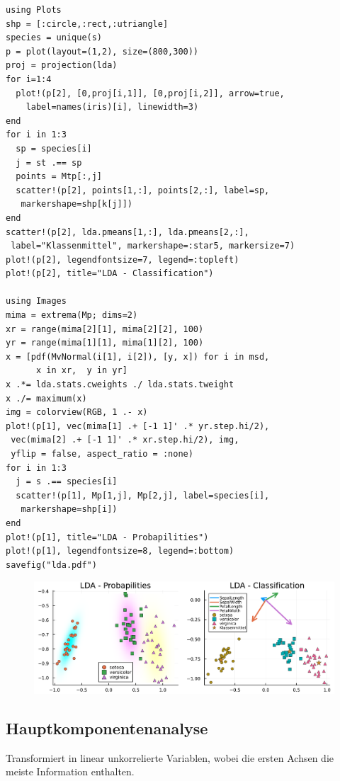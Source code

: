\documentclass[10pt,twocolumn]{scrartcl}
\begin{document}
\begin{lstlisting}
using Plots
shp = [:circle,:rect,:utriangle]
species = unique(s)
p = plot(layout=(1,2), size=(800,300))
proj = projection(lda)
for i=1:4
  plot!(p[2], [0,proj[i,1]], [0,proj[i,2]], arrow=true,
    label=names(iris)[i], linewidth=3)
end
for i in 1:3
  sp = species[i]
  j = st .== sp
  points = Mtp[:,j]
  scatter!(p[2], points[1,:], points[2,:], label=sp,
   markershape=shp[k[j]])
end
scatter!(p[2], lda.pmeans[1,:], lda.pmeans[2,:],
 label="Klassenmittel", markershape=:star5, markersize=7)
plot!(p[2], legendfontsize=7, legend=:topleft)
plot!(p[2], title="LDA - Classification")

using Images
mima = extrema(Mp; dims=2)
xr = range(mima[2][1], mima[2][2], 100)
yr = range(mima[1][1], mima[1][2], 100)
x = [pdf(MvNormal(i[1], i[2]), [y, x]) for i in msd,
      x in xr,  y in yr]
x .*= lda.stats.cweights ./ lda.stats.tweight
x ./= maximum(x)
img = colorview(RGB, 1 .- x)
plot!(p[1], vec(mima[1] .+ [-1 1]' .* yr.step.hi/2),
 vec(mima[2] .+ [-1 1]' .* xr.step.hi/2), img,
 yflip = false, aspect_ratio = :none)
for i in 1:3
  j = s .== species[i]
  scatter!(p[1], Mp[1,j], Mp[2,j], label=species[i],
   markershape=shp[i])
end
plot!(p[1], title="LDA - Probapilities")
plot!(p[1], legendfontsize=8, legend=:bottom)
savefig("lda.pdf")
\end{lstlisting}

\begin{figure}[h]
  \centering
  \includegraphics[width=.95\columnwidth]{lda.pdf}
\end{figure}

\subsection{Hauptkomponentenanalyse}

Transformiert in linear unkorrelierte Variablen, wobei die ersten Achsen die
meiste Information enthalten.
\end{document}
